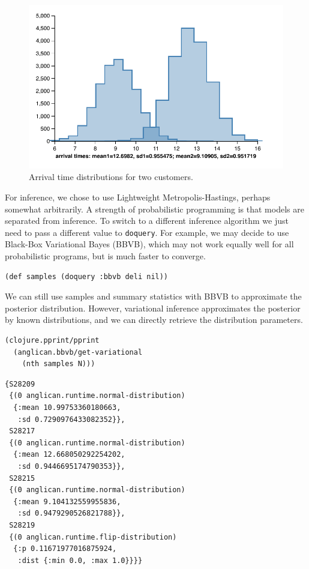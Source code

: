 \documentclass[preprint]{sigplanconf}
\begin{document}
\begin{figure}
    \centering
    \includegraphics[trim={12pt 0 0 0},scale=0.6]{different-customers-times.pdf}
    \caption{Arrival time distributions for two customers.}
    \label{fig:dist-diff}
\end{figure}

For inference, we chose to use  Lightweight
Metropolis-Hastings, perhaps somewhat arbitrarily. A strength of
probabilistic programming is that models are separated from
inference. To switch to a different inference algorithm we just
need to pass a different value to \texttt{doquery}. For example,
we may decide to use Black-Box Variational Bayes (BBVB), which
may not work equally well for all probabilistic programs, but is
much faster to converge.

\begin{lstlisting}[style=default]
(def samples (doquery :bbvb deli nil))
\end{lstlisting}

We can still use samples and summary statistics with BBVB to
approximate the posterior distribution. However, variational
inference approximates the posterior by known distributions,
and we can directly retrieve the distribution parameters.

\begin{lstlisting}[style=default]
(clojure.pprint/pprint
  (anglican.bbvb/get-variational 
    (nth samples N)))
\end{lstlisting}

\begin{lstlisting}[style=default]
{S28209
 {(0 anglican.runtime.normal-distribution)
  {:mean 10.99753360180663,
   :sd 0.7290976433082352}},
 S28217
 {(0 anglican.runtime.normal-distribution)
  {:mean 12.668050292254202,
   :sd 0.9446695174790353}},
 S28215
 {(0 anglican.runtime.normal-distribution)
  {:mean 9.104132559955836,
   :sd 0.9479290526821788}},
 S28219
 {(0 anglican.runtime.flip-distribution)
  {:p 0.11671977016875924,
   :dist {:min 0.0, :max 1.0}}}}
\end{lstlisting}
\end{document}
